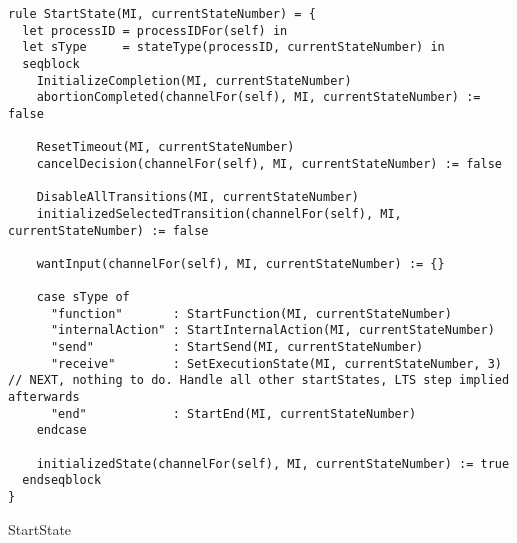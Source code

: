 \begin{listing}[H]
\begin{verbatim}
rule StartState(MI, currentStateNumber) = {
  let processID = processIDFor(self) in
  let sType     = stateType(processID, currentStateNumber) in
  seqblock
    InitializeCompletion(MI, currentStateNumber)
    abortionCompleted(channelFor(self), MI, currentStateNumber) := false

    ResetTimeout(MI, currentStateNumber)
    cancelDecision(channelFor(self), MI, currentStateNumber) := false

    DisableAllTransitions(MI, currentStateNumber)
    initializedSelectedTransition(channelFor(self), MI, currentStateNumber) := false

    wantInput(channelFor(self), MI, currentStateNumber) := {}

    case sType of
      "function"       : StartFunction(MI, currentStateNumber)
      "internalAction" : StartInternalAction(MI, currentStateNumber)
      "send"           : StartSend(MI, currentStateNumber)
      "receive"        : SetExecutionState(MI, currentStateNumber, 3) // NEXT, nothing to do. Handle all other startStates, LTS step implied afterwards
      "end"            : StartEnd(MI, currentStateNumber)
    endcase

    initializedState(channelFor(self), MI, currentStateNumber) := true
  endseqblock
}
\end{verbatim}
\caption{StartState}
\label{lst:asm:StartState}
\end{listing}




